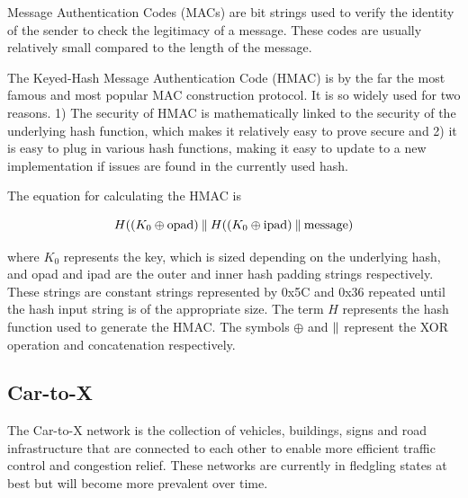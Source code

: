 Message Authentication Codes (MACs) are bit strings used to verify the identity of the sender to check the legitimacy of a message. These codes are usually relatively small compared to the length of the message. 


The Keyed-Hash Message Authentication Code (HMAC)\cite{HMAC}\cite{FIPS-198-1} is by the far the most famous and most popular MAC construction protocol. It is so widely used for two reasons. 1) The security of HMAC is mathematically linked to the security of the underlying hash function, which makes it relatively easy to prove secure and 2) it is easy to plug in various hash functions, making it easy to update to a new implementation if issues are found in the currently used hash.

The equation for calculating the HMAC is

\begin{equation}
H((K_0\oplus \text{opad})\mathbin{\|} H((K_0\oplus \text{ipad})\mathbin{\|} \text{message})
\end{equation}

where $K_0$ represents the key, which is sized depending on the underlying hash, and opad and ipad are the outer and inner hash padding strings respectively. These strings are constant strings represented by 0x5C and 0x36 repeated until the hash input string is of the appropriate size. The term $H$ represents the hash function used to generate the HMAC. The symbols $\oplus$ and $\mathbin{\|}$ represent the XOR operation and concatenation respectively. \cite{FIPS-198-1}

\subsection{Car-to-X}
The Car-to-X network is the collection of vehicles, buildings, signs and road infrastructure that are connected to each other to enable more efficient traffic control and congestion relief. These networks are currently in fledgling states at best but will become more prevalent over time\cite{C2X}.